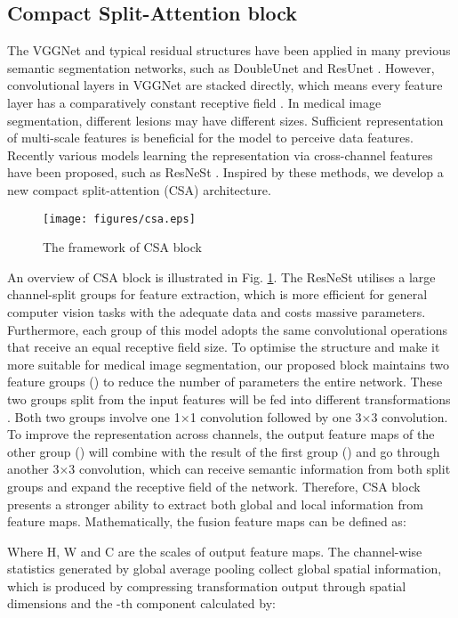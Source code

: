 \documentclass[a4paper,fleqn]{cas-dc}
\begin{document}
\subsection{Compact Split-Attention block}
\label{ssec:subhead}

The VGGNet \cite{simonyan2014very} and typical residual structures \cite{he2016deep} have been applied in many previous semantic segmentation networks, such as DoubleUnet \cite{jha2020doubleu} and ResUnet \cite{zhang2018road}. However, convolutional layers in VGGNet are stacked directly, which means every feature layer has a comparatively constant receptive field \cite{gao2019res2net}. In medical image segmentation, different lesions may have different sizes. Sufficient representation of multi-scale features is beneficial for the model to perceive data features. Recently various models learning the representation via cross-channel features have been proposed, such as ResNeSt \cite{zhang2022resnest}. Inspired by these methods, we develop a new compact split-attention (CSA) architecture.
\begin{figure}
  \centering
\texttt{[image: figures/csa.eps]}
  \caption{The framework of CSA block}
  \label{fig:csa}
\end{figure}

An overview of CSA block is illustrated in Fig. \ref{fig:csa}. The ResNeSt utilises a large channel-split groups for feature extraction, which is more efficient for general computer vision tasks with the adequate data and costs massive parameters. Furthermore, each group of this model adopts the same convolutional operations that receive an equal receptive field size. To optimise the structure and make it more suitable for medical image segmentation, our proposed block maintains two feature groups () to reduce the number of parameters the entire network. These two groups split from the input features will be fed into different transformations . Both two groups involve one 1×1 convolution followed by one 3×3 convolution. To improve the representation across channels, the output feature maps of the other group () will combine with the result of the first group () and go through another 3×3 convolution, which can receive semantic information from both split groups and expand the receptive field of the network. Therefore, CSA block presents a stronger ability to extract both global and local information from feature maps. Mathematically, the fusion feature maps can be defined as:

Where H, W and C are the scales of output feature maps. The channel-wise statistics generated by global average pooling collect global spatial information, which is produced by compressing transformation output through spatial dimensions and the -th component calculated by:
\end{document}
